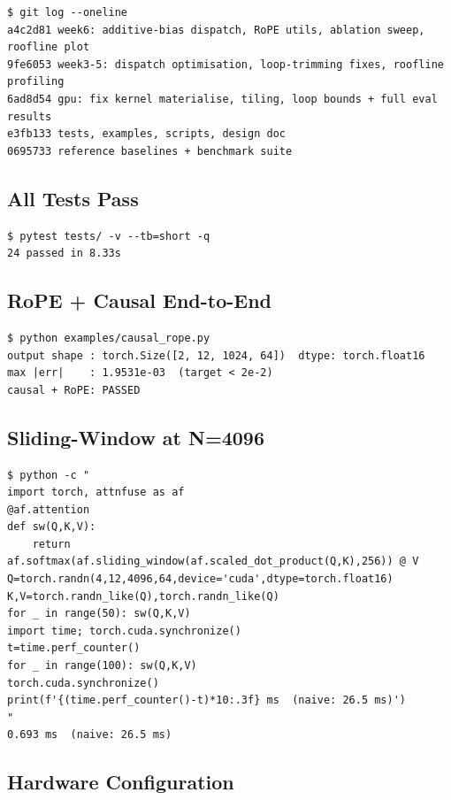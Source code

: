 \documentclass[12pt]{article}
\begin{document}
\begin{lstlisting}[style=terminal]
$ git log --oneline
a4c2d81 week6: additive-bias dispatch, RoPE utils, ablation sweep, roofline plot
9fe6053 week3-5: dispatch optimisation, loop-trimming fixes, roofline profiling
6ad8d54 gpu: fix kernel materialise, tiling, loop bounds + full eval results
e3fb133 tests, examples, scripts, design doc
0695733 reference baselines + benchmark suite
\end{lstlisting}

\subsection{All Tests Pass}

\begin{lstlisting}[style=terminal]
$ pytest tests/ -v --tb=short -q
24 passed in 8.33s
\end{lstlisting}

\subsection{RoPE + Causal End-to-End}

\begin{lstlisting}[style=terminal]
$ python examples/causal_rope.py
output shape : torch.Size([2, 12, 1024, 64])  dtype: torch.float16
max |err|    : 1.9531e-03  (target < 2e-2)
causal + RoPE: PASSED
\end{lstlisting}

\subsection{Sliding-Window at N=4096}

\begin{lstlisting}[style=terminal]
$ python -c "
import torch, attnfuse as af
@af.attention
def sw(Q,K,V):
    return af.softmax(af.sliding_window(af.scaled_dot_product(Q,K),256)) @ V
Q=torch.randn(4,12,4096,64,device='cuda',dtype=torch.float16)
K,V=torch.randn_like(Q),torch.randn_like(Q)
for _ in range(50): sw(Q,K,V)
import time; torch.cuda.synchronize()
t=time.perf_counter()
for _ in range(100): sw(Q,K,V)
torch.cuda.synchronize()
print(f'{(time.perf_counter()-t)*10:.3f} ms  (naive: 26.5 ms)')
"
0.693 ms  (naive: 26.5 ms)
\end{lstlisting}

\subsection{Hardware Configuration}
\end{document}
